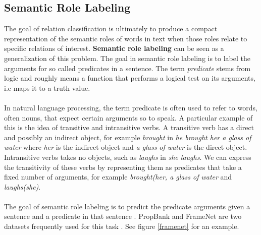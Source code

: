 \subsection{Semantic Role Labeling}
The goal of relation classification is ultimately to produce a compact representation of the semantic roles of words in text when those roles relate to specific relations of interest. \textbf{Semantic role labeling} can be seen as a generalization of this problem. The goal in semantic role labeling is to label the arguments for so called predicates in a sentence. The term \textit{predicate} stems from logic and roughly means a function that performs a logical test on its arguments, i.e maps it to a truth value. 
\\\\
In natural language processing, the term predicate is often used to refer to words, often nouns, that expect certain arguments so to speak. A particular example of this is the idea of transitive and intransitive verbs. A transitive verb has a direct and possibly an indirect object, for example \textit{brought} in \textit{he brought her a glass of water} where \textit{her} is the indirect object and \textit{a glass of water} is the direct object. Intransitive verbs takes no objects, such as \textit{laughs} in \textit{she laughs}. We can express the transitivity of these verbs by representing them as predicates that take a fixed number of arguments, for example \textit{brought(her, a glass of water} and \textit{laughs(she)}.
\\\\
The goal of semantic role labeling is to predict the predicate arguments given a sentence and a predicate in that sentence \citep{jurafsky09}. PropBank and FrameNet are two datasets frequently used for this task \citep{kingsbury2002, baker1998}. See figure \ref{framenet} for an example.

